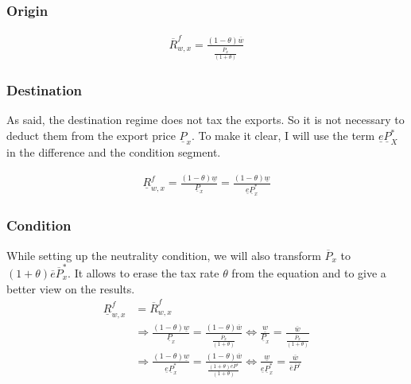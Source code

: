 \subsubsection*{Origin}
\begin{equation}\label{proxw.o}
\begin{aligned}
\overline R^f_{w, x} = \frac{ \left( 1-\theta \right) \overline w}{\frac{\overline P_x}{ \left( 1+\theta \right) }}\end{aligned}  \end{equation}

\subsubsection*{Destination}
As said, the destination regime does not tax the exports. So it is not necessary to deduct them from the export price $\underline P_x$. To make it clear, I will use the term $\underline e \underline P_X^*$ in the difference and the condition segment.


\begin{equation}\label{proxw.d} 
\begin{aligned}
\underline R^f_{w, x} = \frac{ \left( 1-\theta \right) \underline w}{\underline P_x} = \frac{ \left( 1-\theta \right) \underline w}{\underline e \underline P^*_x}\end{aligned}  \end{equation}


\subsubsection*{Condition}
While setting up the neutrality condition, we will also transform $\overline P_x$ to $(1+\theta)\overline e \overline P_x^*$. It allows to erase the tax rate $\theta$ from the equation and to give a better view on the results.
\begin{equation}\label{proxw.con}
\begin{aligned}
    \underline R^f_{w, x} &= \overline R^f_{w, x} \\ &\Rightarrow \frac{ \left( 1-\theta \right) \underline w}{\underline P_x} = \frac{ \left( 1-\theta \right) \overline w}{\frac{\overline P_x}{ \left( 1+\theta \right) }} \Leftrightarrow \frac{\underline w}{\underline P_x} = \frac{\overline w}{\frac{\overline P_x}{ \left( 1+\theta \right) }} \\ &\Rightarrow \frac{ \left( 1-\theta \right) \underline w}{\underline e \underline P^*_x} = \frac{ \left( 1-\theta \right) \overline w}{\frac{ \left( 1+\theta \right) \overline e \overline P^_x}{ \left( 1+\theta \right) }} \Leftrightarrow  \frac{\underline w}{\underline e \underline P^*_x} = \frac{\overline w}{\overline e \overline P^_x} 
\end{aligned}  
\end{equation}

